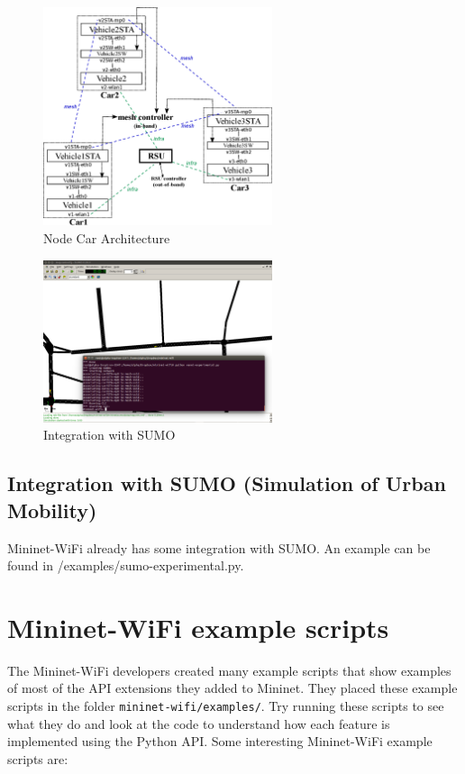 \begin{figure}[!t]
\centering
\includegraphics[width=0.6\textwidth]{Pictures/vanet.eps}
\caption{Node Car Architecture}
\label{fig:cararch}
\end{figure}

\begin{figure}[!b]
\centering
\includegraphics[width=0.6\textwidth]{Pictures/sumo.png}
\caption{Integration with SUMO}
\label{fig:sumo}
\end{figure}

\subsection{Integration with SUMO (Simulation of Urban Mobility)}
    
Mininet-WiFi already has some integration with SUMO. An example can be found in /examples/sumo-experimental.py.
    
\section{Mininet-WiFi example scripts}

The Mininet-WiFi developers created many example scripts that show examples of most of the API extensions they added to Mininet. They placed these example scripts in the folder \texttt{mininet-wifi/examples/}. Try running these scripts to see what they do and look at the code to understand how each feature is implemented using the Python API. Some interesting Mininet-WiFi example scripts are:


